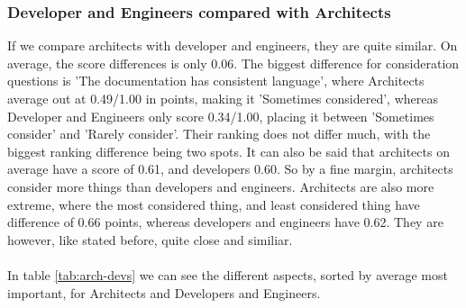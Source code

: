 \documentclass{article}
\begin{document}
\subsubsection{Developer and Engineers compared with Architects}
If we compare architects with developer and engineers, they
are quite similar. On average, the score differences is only 0.06. The
biggest difference for consideration questions is 'The documentation has
consistent language', where Architects average out at 0.49/1.00 in
points, making it 'Sometimes considered', whereas Developer and
Engineers only score 0.34/1.00, placing it between 'Sometimes consider'
and 'Rarely consider'. Their ranking does not differ much, with the
biggest ranking difference being two spots.
It can also be said that architects on average have a score of 0.61, and developers 0.60. So by a fine margin, architects consider more things than developers and engineers. Architects are also more extreme, where the most considered thing, and least considered thing have difference of 0.66 points, whereas developers and engineers have 0.62. They are however, like stated before, quite close and similiar.
\\ \\
In table \ref{tab:arch-devs} we can see the different aspects, sorted by average most
important, for Architects and Developers and Engineers.
\end{document}
